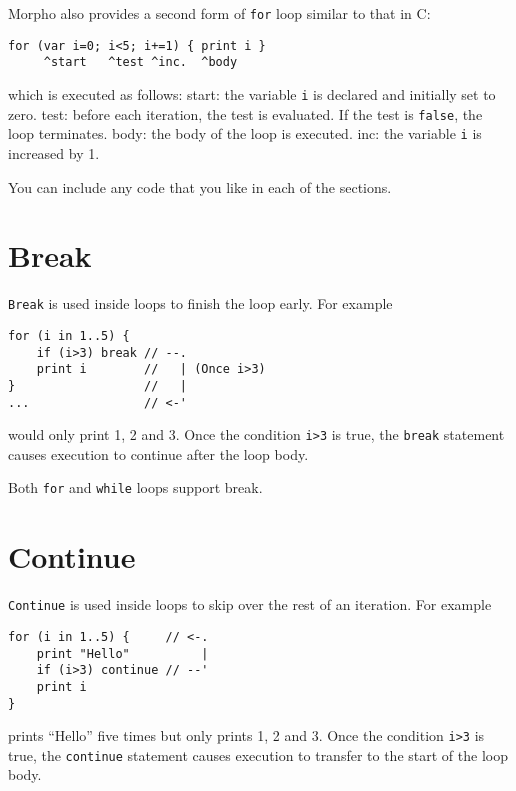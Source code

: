 Morpho also provides a second form of \texttt{for} loop similar to that
in C:

\begin{lstlisting}
for (var i=0; i<5; i+=1) { print i }
     ^start   ^test ^inc.  ^body
\end{lstlisting}

which is executed as follows: start: the variable \texttt{i} is declared
and initially set to zero. test: before each iteration, the test is
evaluated. If the test is \texttt{false}, the loop terminates. body: the
body of the loop is executed. inc: the variable \texttt{i} is increased
by 1.

You can include any code that you like in each of the sections.

\hypertarget{break}{%
\section{Break}\label{break}}

\texttt{Break} is used inside loops to finish the loop early. For
example

\begin{lstlisting}
for (i in 1..5) {
    if (i>3) break // --.
    print i        //   | (Once i>3)
}                  //   |
...                // <-'
\end{lstlisting}

would only print 1, 2 and 3. Once the condition
\texttt{i\textgreater{}3} is true, the \texttt{break} statement causes
execution to continue after the loop body.

Both \texttt{for} and \texttt{while} loops support break.

\hypertarget{continue}{%
\section{Continue}\label{continue}}

\texttt{Continue} is used inside loops to skip over the rest of an
iteration. For example

\begin{lstlisting}
for (i in 1..5) {     // <-.
    print "Hello"          |
    if (i>3) continue // --'
    print i
}                     
\end{lstlisting}

prints ``Hello'' five times but only prints 1, 2 and 3. Once the
condition \texttt{i\textgreater{}3} is true, the \texttt{continue}
statement causes execution to transfer to the start of the loop body.

